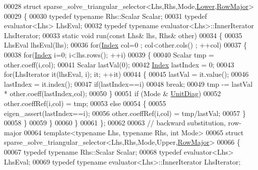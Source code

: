 \begin{DoxyCode}
00028 \textcolor{keyword}{struct }sparse\_solve\_triangular\_selector<Lhs,Rhs,Mode,\hyperlink{group__enums_gga39e3366ff5554d731e7dc8bb642f83cda891792b8ed394f7607ab16dd716f60e6}{Lower},\hyperlink{group__enums_ggaacded1a18ae58b0f554751f6cdf9eb13acfcde9cd8677c5f7caf6bd603666aae3}{RowMajor}>
00029 \{
00030   \textcolor{keyword}{typedef} \textcolor{keyword}{typename} Rhs::Scalar Scalar;
00031   \textcolor{keyword}{typedef} evaluator<Lhs> LhsEval;
00032   \textcolor{keyword}{typedef} \textcolor{keyword}{typename} evaluator<Lhs>::InnerIterator LhsIterator;
00033   \textcolor{keyword}{static} \textcolor{keywordtype}{void} run(\textcolor{keyword}{const} Lhs& lhs, Rhs& other)
00034   \{
00035     LhsEval lhsEval(lhs);
00036     \textcolor{keywordflow}{for}(\hyperlink{namespace_eigen_a62e77e0933482dafde8fe197d9a2cfde}{Index} col=0 ; col<other.cols() ; ++col)
00037     \{
00038       \textcolor{keywordflow}{for}(\hyperlink{namespace_eigen_a62e77e0933482dafde8fe197d9a2cfde}{Index} i=0; i<lhs.rows(); ++i)
00039       \{
00040         Scalar tmp = other.coeff(i,col);
00041         Scalar lastVal(0);
00042         \hyperlink{namespace_eigen_a62e77e0933482dafde8fe197d9a2cfde}{Index} lastIndex = 0;
00043         \textcolor{keywordflow}{for}(LhsIterator it(lhsEval, i); it; ++it)
00044         \{
00045           lastVal = it.value();
00046           lastIndex = it.index();
00047           \textcolor{keywordflow}{if}(lastIndex==i)
00048             \textcolor{keywordflow}{break};
00049           tmp -= lastVal * other.coeff(lastIndex,col);
00050         \}
00051         \textcolor{keywordflow}{if} (Mode & \hyperlink{group__enums_gga39e3366ff5554d731e7dc8bb642f83cdaddb72f888ac85d5a1c52333e54f9374b}{UnitDiag})
00052           other.coeffRef(i,col) = tmp;
00053         \textcolor{keywordflow}{else}
00054         \{
00055           eigen\_assert(lastIndex==i);
00056           other.coeffRef(i,col) = tmp/lastVal;
00057         \}
00058       \}
00059     \}
00060   \}
00061 \};
00062 
00063 \textcolor{comment}{// backward substitution, row-major}
00064 \textcolor{keyword}{template}<\textcolor{keyword}{typename} Lhs, \textcolor{keyword}{typename} Rhs, \textcolor{keywordtype}{int} Mode>
00065 \textcolor{keyword}{struct }sparse\_solve\_triangular\_selector<Lhs,Rhs,Mode,Upper,\hyperlink{group__enums_ggaacded1a18ae58b0f554751f6cdf9eb13acfcde9cd8677c5f7caf6bd603666aae3}{RowMajor}>
00066 \{
00067   \textcolor{keyword}{typedef} \textcolor{keyword}{typename} Rhs::Scalar Scalar;
00068   \textcolor{keyword}{typedef} evaluator<Lhs> LhsEval;
00069   \textcolor{keyword}{typedef} \textcolor{keyword}{typename} evaluator<Lhs>::InnerIterator LhsIterator;

\end{DoxyCode}
